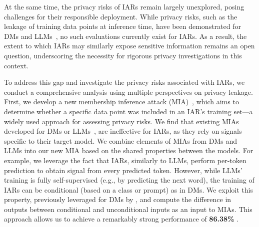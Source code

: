 At the same time, the privacy risks of IARs remain largely unexplored, posing challenges for their responsible deployment. While privacy risks, such as the leakage of training data points at inference time, have been demonstrated for DMs and LLMs~\citep{carlini2021extractLLM,carlini2023extracting,huang2024demystifying,wen2024detecting}, no such evaluations currently exist for IARs. As a result, the extent to which IARs may similarly expose sensitive information remains an open question, underscoring the necessity for rigorous privacy investigations in this context.



To address this gap and investigate the privacy risks associated with IARs, we conduct a comprehensive analysis using multiple perspectives on privacy leakage. First, we develop a new membership inference attack (MIA)~\citep{shokri2017membershipinference}, which aims to determine whether a specific data point was included in an IAR's training set—a widely used approach for assessing privacy risks. We find that existing MIAs developed for DMs \citep{carlini2023extracting, dm2_duan23bSecMI, kong2023efficient, zhai2024clid} or LLMs~\citep{mattern2023membershipLLM, shi2024detecting}, are ineffective for IARs, as they rely on signals specific to their target model.
We combine elements of MIAs from DMs and LLMs into our new MIA based on the shared properties between the models. For example, we leverage the fact that IARs, similarly to LLMs, perform per-token prediction to obtain signal from every predicted token. However, while LLMs' training is fully self-supervised (e.g., by predicting the next word), the training of IARs can be conditional (based on a class or prompt) as in DMs. We exploit this property, previously leveraged for DMs by \cite{zhai2024clid}, and compute the difference in outputs between
conditional and unconditional inputs as an input to MIAs. This approach allows us to achieve a remarkably strong performance of \textbf{86.38\%} \tprat.

